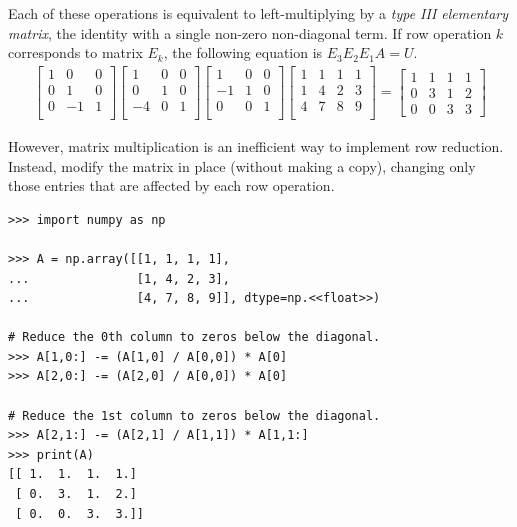 Each of these operations is equivalent to left-multiplying by a \emph{type III elementary matrix}, the identity with a single non-zero non-diagonal term.
If row operation $k$ corresponds to matrix $E_k$, the following equation is $E_3E_2E_1A = U$.
%
\begin{align*}
\left[\begin{array}{ccc}
1 & 0 & 0 \\
0 & 1 & 0 \\
0 & -1 & 1 \\
\end{array}\right]
\left[\begin{array}{ccc}
1 & 0 & 0 \\
0 & 1 & 0 \\
-4 & 0 & 1 \\
\end{array}\right]
\left[\begin{array}{ccc}
1 & 0 & 0 \\
-1 & 1 & 0 \\
0 & 0 & 1 \\
\end{array}\right]
\left[\begin{array}{ccc|c}
1 & 1 & 1 & 1 \\
1 & 4 & 2 & 3 \\
4 & 7 & 8 & 9 \\
\end{array}\right]
=
\left[\begin{array}{ccc|c}
1 & 1 & 1 & 1 \\
0 & 3 & 1 & 2 \\
0 & 0 & 3 & 3
\end{array}\right]
\end{align*}

However, matrix multiplication is an inefficient way to implement row reduction.
Instead, modify the matrix in place (without making a copy), changing only those entries that are affected by each row operation.

\begin{lstlisting}
>>> import numpy as np

>>> A = np.array([[1, 1, 1, 1],
...               [1, 4, 2, 3],
...               [4, 7, 8, 9]], dtype=np.<<float>>)

# Reduce the 0th column to zeros below the diagonal.
>>> A[1,0:] -= (A[1,0] / A[0,0]) * A[0]
>>> A[2,0:] -= (A[2,0] / A[0,0]) * A[0]

# Reduce the 1st column to zeros below the diagonal.
>>> A[2,1:] -= (A[2,1] / A[1,1]) * A[1,1:]
>>> print(A)
[[ 1.  1.  1.  1.]
 [ 0.  3.  1.  2.]
 [ 0.  0.  3.  3.]]
\end{lstlisting}

